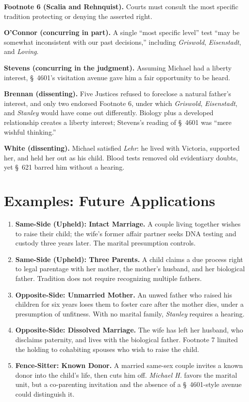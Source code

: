 \documentclass[12pt]{article}
\begin{document}
\textbf{Footnote 6 (Scalia and Rehnquist).} Courts must consult the most specific tradition protecting or denying the asserted right.

\textbf{O'Connor (concurring in part).} A single ``most specific level'' test ``may be somewhat inconsistent with our past decisions,'' including \textit{Griswold}, \textit{Eisenstadt}, and \textit{Loving}.

\textbf{Stevens (concurring in the judgment).} Assuming Michael had a liberty interest, \S~4601's visitation avenue gave him a fair opportunity to be heard.

\textbf{Brennan (dissenting).} Five Justices refused to foreclose a natural father's interest, and only two endorsed Footnote 6, under which \textit{Griswold}, \textit{Eisenstadt}, and \textit{Stanley} would have come out differently. Biology plus a developed relationship creates a liberty interest; Stevens's reading of \S~4601 was ``mere wishful thinking.''

\textbf{White (dissenting).} Michael satisfied \textit{Lehr}: he lived with Victoria, supported her, and held her out as his child. Blood tests removed old evidentiary doubts, yet \S~621 barred him without a hearing.

\section{Examples: Future Applications}

\begin{enumerate}
\item \textbf{Same-Side (Upheld): Intact Marriage.} A couple living together wishes to raise their child; the wife's former affair partner seeks DNA testing and custody three years later. The marital presumption controls.
\item \textbf{Same-Side (Upheld): Three Parents.} A child claims a due process right to legal parentage with her mother, the mother's husband, and her biological father. Tradition does not require recognizing multiple fathers.
\item \textbf{Opposite-Side: Unmarried Mother.} An unwed father who raised his children for six years loses them to foster care after the mother dies, under a presumption of unfitness. With no marital family, \textit{Stanley} requires a hearing.
\item \textbf{Opposite-Side: Dissolved Marriage.} The wife has left her husband, who disclaims paternity, and lives with the biological father. Footnote 7 limited the holding to cohabiting spouses who wish to raise the child.
\item \textbf{Fence-Sitter: Known Donor.} A married same-sex couple invites a known donor into the child's life, then cuts him off. \textit{Michael H.} favors the marital unit, but a co-parenting invitation and the absence of a \S~4601-style avenue could distinguish it.
\end{enumerate}
\end{document}
